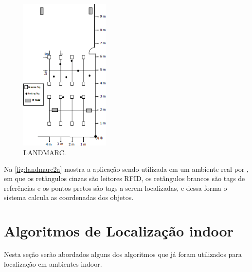     \begin{figure}[H]
              \caption{\label{fig:landmarc2a}{LANDMARC.}}
              \centering
              \includegraphics[width=0.4\textwidth]{Figuras/landmarc2a.png}
        \end{figure}
    \par
    Na \autoref{fig:landmarc2a} mostra a aplicação sendo utilizada em um ambiente real por , em que os retângulos cinzas são leitores RFID, os retângulos brancos são tags de referências e os pontos pretos são tags a serem localizadas, e dessa forma o sistema calcula as coordenadas dos objetos.

\section{Algoritmos de Localização indoor}
Nesta seção serão abordados alguns dos algoritmos que já foram utilizados para localização em ambientes indoor.
